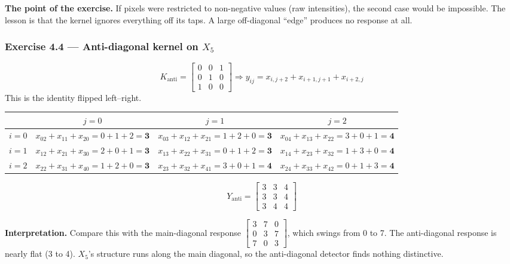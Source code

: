 \textbf{The point of the exercise.} If pixels were restricted to non-negative values (raw intensities), the second case would be impossible. The lesson is that the kernel ignores everything off its taps. A large off-diagonal ``edge'' produces no response at all.

\subsubsection*{Exercise 4.4 --- Anti-diagonal kernel on $X_5$}

\[
K_{\text{anti}} = \begin{bmatrix}0&0&1\\0&1&0\\1&0&0\end{bmatrix} \Rightarrow y_{ij} = x_{i,j+2} + x_{i+1,j+1} + x_{i+2,j}
\]
This is the identity flipped left--right.

\begin{center}
\begin{tabular}{cccc}
\toprule
 & $j=0$ & $j=1$ & $j=2$ \\
\midrule
$i=0$ & $x_{02}+x_{11}+x_{20} = 0+1+2 = \mathbf{3}$ & $x_{03}+x_{12}+x_{21} = 1+2+0 = \mathbf{3}$ & $x_{04}+x_{13}+x_{22} = 3+0+1 = \mathbf{4}$ \\
$i=1$ & $x_{12}+x_{21}+x_{30} = 2+0+1 = \mathbf{3}$ & $x_{13}+x_{22}+x_{31} = 0+1+2 = \mathbf{3}$ & $x_{14}+x_{23}+x_{32} = 1+3+0 = \mathbf{4}$ \\
$i=2$ & $x_{22}+x_{31}+x_{40} = 1+2+0 = \mathbf{3}$ & $x_{23}+x_{32}+x_{41} = 3+0+1 = \mathbf{4}$ & $x_{24}+x_{33}+x_{42} = 0+1+3 = \mathbf{4}$ \\
\bottomrule
\end{tabular}
\end{center}
\[
Y_{\text{anti}} = \begin{bmatrix}3&3&4\\3&3&4\\3&4&4\end{bmatrix}
\]

\textbf{Interpretation.} Compare this with the main-diagonal response $\begin{bmatrix}3&7&0\\0&3&7\\7&0&3\end{bmatrix}$, which swings from 0 to 7. The anti-diagonal response is nearly flat (3 to 4). $X_5$'s structure runs along the main diagonal, so the anti-diagonal detector finds nothing distinctive.

